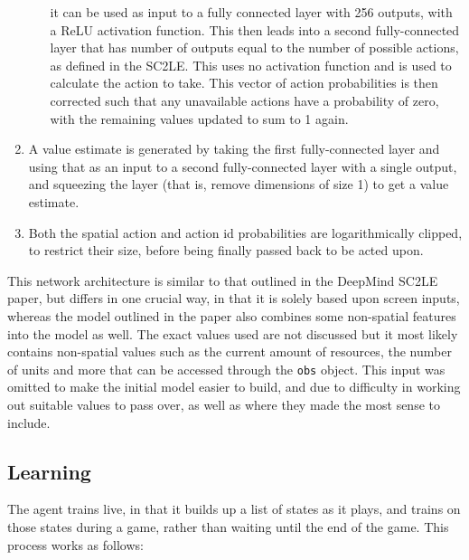 \begin{enumerate}
\begin{enumerate}
            it can be used as input to a fully connected layer with 256 outputs,
            with a ReLU activation function. This then leads into a second
            fully-connected layer that has number of outputs equal to the
            number of possible actions, as defined in the SC2LE\@. This uses no
            activation function and is used to calculate the action to take.
            This vector of action probabilities is then corrected such that any
            unavailable actions have a probability of zero, with the remaining
            values updated to sum to 1 again.
    \end{enumerate}
    \item A value estimate is generated by taking the first fully-connected
        layer and using that as an input to a second fully-connected layer with
        a single output, and squeezing the layer (that is, remove dimensions of
        size 1) to get a value estimate.
    \item Both the spatial action and action id probabilities are
        logarithmically clipped, to restrict their size, before being finally
        passed back to be acted upon.
\end{enumerate}

This network architecture is similar to that outlined in the DeepMind SC2LE
paper, but differs in one crucial way, in that it is solely based upon screen
inputs, whereas the model outlined in the paper also combines some non-spatial
features into the model as well. The exact values used are not discussed but it
most likely contains non-spatial values such as the current amount of resources,
the number of units and more that can be accessed through the \texttt{obs} object.
This input was omitted to make the initial model easier to build, and due to
difficulty in working out suitable values to pass over, as well as where they
made the most sense to include.

\subsection{Learning}

The agent trains live, in that it builds up a list of states as it plays, and
trains on those states during a game, rather than waiting until the end of the
game. This process works as follows:

